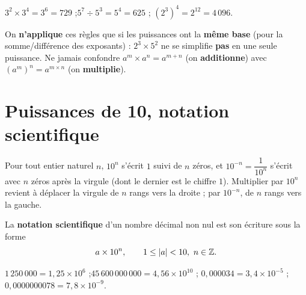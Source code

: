 \begin{exemple}
$3^{2}\times3^{4}=3^{6}=729$ ;\quad $5^{7}\div5^{3}=5^{4}=625$ ;\quad
$\left(2^{3}\right)^{4}=2^{12}=4\,096$.
\end{exemple}

\begin{illus}
\end{illus}

\begin{aretenir}
On \textbf{n'applique} ces règles que si les puissances ont la \textbf{même base} (pour la
somme/différence des exposants) : $2^{3}\times5^{2}$ ne se simplifie \textbf{pas} en une seule
puissance. Ne jamais confondre $a^{m}\times a^{n}=a^{m+n}$ (on \textbf{additionne}) avec
$\left(a^{m}\right)^{n}=a^{m\times n}$ (on \textbf{multiplie}).
\end{aretenir}

\section{Puissances de 10, notation scientifique}

\begin{propriete}[Puissances de 10]
Pour tout entier naturel $n$, $10^{n}$ s'écrit $1$ suivi de $n$ zéros, et
$10^{-n}=\dfrac1{10^{n}}$ s'écrit avec $n$ zéros après la virgule (dont le dernier est le
chiffre $1$). Multiplier par $10^{n}$ revient à déplacer la virgule de $n$ rangs vers la
droite ; par $10^{-n}$, de $n$ rangs vers la gauche.
\end{propriete}

\begin{definition}
La \textbf{notation scientifique} d'un nombre décimal non nul est son écriture sous la forme
\[
a\times10^{n}, \qquad 1\le|a|<10,\ n\in\Z.
\]
\end{definition}

\begin{exemple}
$1\,250\,000=1{,}25\times10^{6}$ ;\quad $45\,600\,000\,000=4{,}56\times10^{10}$ ;\quad
$0{,}000034=3{,}4\times10^{-5}$ ;\quad $0{,}0000000078=7{,}8\times10^{-9}$.
\end{exemple}

